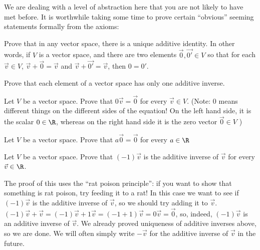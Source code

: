 	We are dealing with a level of abstraction here that you are not likely to have met before.  It is worthwhile taking some time to prove certain ``obvious'' seeming
	statements formally from the axioms:
	
	\begin{question}
		Prove that in any vector space, there is a unique additive identity.  In other words, if $V$ is a vector space, and there are two elements $\vec{0},\vec{0'} \in V$ so that for each 
		$\vec{v} \in V$, $\vec{v}+\vec{0}=\vec{v}$ and $\vec{v} + \vec{0'} = \vec{v}$, then $0=0'$.
	\end{question}
	
	\begin{question}
		Prove that each element of a vector space has only one additive inverse.
	\end{question}
	
	\begin{question}
		Let $V$ be a vector space. Prove that $0\vec{v} = \vec{0}$ for every $\vec{v} \in V$. (Note: $0$ means different things on the different sides of the equation!  On
		the left hand side, it is the scalar $0\in\R$, whereas on the right hand side it is the zero vector $\vec{0} \in V$ )
	\end{question}
	
	\begin{question}
		Let $V$ be a vector space.  Prove that $a\vec{0} = \vec{0}$ for every $a \in \R$
	\end{question}
	
	\begin{question}
		Let $V$ be a vector space.  Prove that $(-1)\vec{v}$ is the additive inverse of $\vec{v}$ for every $\vec{v} \in \R$.
		
		\begin{answer}
			The proof of this uses the ``rat poison principle'':  if you want to show that something is rat poison, try feeding it to a rat! 
			In this case we want to see if $(-1)\vec{v}$ is the additive inverse of $\vec{v}$, so we should try adding it to $\vec{v}$.
			$(-1)\vec{v}+\vec{v} = (-1)\vec{v}+1\vec{v} = (-1+1)\vec{v} = 0\vec{v} = \vec{0}$, so, indeed, $(-1)\vec{v}$ is an additive inverse
			of $\vec{v}$.  We already proved uniqueness of additive inverses above, so we are done.  We will often simply write $-\vec{v}$ for the additive inverse of
			$\vec{v}$ in the future.
		\end{answer}
	\end{question}
	
